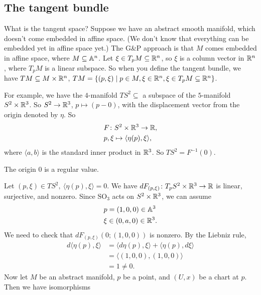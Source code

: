 \subsection{The tangent bundle}
What is the tangent space? Suppose we have an abstract smooth manifold, which doesn't come embedded in affine space. (We don't know that everything can be embedded yet in affine space yet.) The G\&{}P approach is that $M$ comes embedded in affine space, where $M \subseteq \mathbb{A}^n $. Let $\xi \in T_p M \subseteq \mathbb{R}^n $, so $\xi$ is a column vector in $\mathbb{R}^n $, where $T_p M$ is a linear subspace. So when you define the tangent bundle, we have $TM \subseteq M \times \mathbb{R}^n $, $TM= \{(p,\xi) \mid p \in M, \xi \in \mathbb{R}^n , \xi \in T_p M \subseteq \mathbb{R}^n \} $.

For example, we have the $4$-manifold $T S ^2 \subseteq $ a subspace of the $5$-manifold $S ^2 \times  \mathbb{R}^3$. So $S^2 \to  \mathbb{R}^3$, $p \mapsto  (p-0)$, with the displacement vector from the origin denoted by $\eta$. So 
\begin{align*}
    &F \colon S^2 \times \mathbb{R}^3 \to \mathbb{R},\\
    &p,\xi  \mapsto \langle \eta(p),\xi \rangle ,
\end{align*} where $\langle a,b \rangle $ is the standard inner product in $\mathbb{R}^3$. So $TS ^2=F ^{-1}(0)$.
\begin{claim}
    The origin 0 is a regular value.
\end{claim}
Let $(p,\xi) \in T S ^2, \ \langle \eta(p), \xi \rangle =0$. We have $dF _{(p,\xi)}\colon T_p S^2 \times \mathbb{R}^3 \to \mathbb{R}$ is linear, surjective, and nonzero. Since $\mathrm{SO}_3$ acts on $S^2 \times  \mathbb{R}^3$, we can assume 
\begin{align*}
    &p =(1,0,0) \in \mathbb{A}^3\\
    &\xi \in (0,a,0) \in \mathbb{R}^3.
\end{align*}We need to check that $dF_{(p,\xi)}\left( 0;(1,0,0) \right) $ is nonzero. By the Liebniz rule, 
\begin{align*}
    d\langle \eta(p),\xi \rangle &= \langle d\eta(p),\xi \rangle +\langle \eta(p),d\xi \rangle \\
                                 &=\langle (1,0,0),(1,0,0) \rangle \\
                                 &=1\neq 0.
\end{align*}
Now let $M$ be an abstract manifold, $p$ be a point, and $(U,x)$ be a chart at $p$. Then we have isomorphisms 

